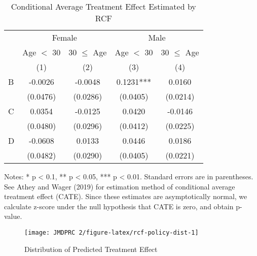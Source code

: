 \documentclass[
  11pt,
  a4paper
]{article}
\begin{document}
\begin{table}[H]

\caption{\label{tab:rcf-int-cate}Conditional Average Treatment Effect Estimated by RCF}
\centering
\fontsize{9}{11}\selectfont
\begin{threeparttable}
\begin{tabular}[t]{lcccc}
\toprule
\multicolumn{1}{c}{ } & \multicolumn{2}{c}{Female} & \multicolumn{2}{c}{Male} \\
\cmidrule(l{3pt}r{3pt}){2-3} \cmidrule(l{3pt}r{3pt}){4-5}
\multicolumn{1}{c}{ } & \multicolumn{1}{c}{Age $<$ 30} & \multicolumn{1}{c}{30 $\le$ Age} & \multicolumn{1}{c}{Age $<$ 30} & \multicolumn{1}{c}{30 $\le$ Age} \\
\cmidrule(l{3pt}r{3pt}){2-2} \cmidrule(l{3pt}r{3pt}){3-3} \cmidrule(l{3pt}r{3pt}){4-4} \cmidrule(l{3pt}r{3pt}){5-5}
 & (1) & (2) & (3) & (4)\\
\midrule
B & -0.0026 & -0.0048 & 0.1231*** & 0.0160\\
 & (0.0476) & (0.0286) & (0.0405) & (0.0214)\\
C & 0.0354 & -0.0125 & 0.0420 & -0.0146\\
 & (0.0480) & (0.0296) & (0.0412) & (0.0225)\\
D & -0.0608 & 0.0133 & 0.0446 & 0.0186\\
 & (0.0482) & (0.0290) & (0.0405) & (0.0221)\\
\bottomrule
\end{tabular}
\begin{tablenotes}
\item Notes: * p < 0.1, ** p < 0.05, *** p < 0.01. Standard errors are in parentheses. See Athey and Wager (2019) for estimation method of conditional average treatment effect (CATE). Since these estimates are asymptotically normal, we calculate z-score under the null hypothesis that CATE is zero, and obtain p-value. 
\end{tablenotes}
\end{threeparttable}
\end{table}

\begin{figure}[t]
\texttt{[image: JMDPRC~2/figure-latex/rcf-policy-dist-1]} \caption{Distribution of Predicted Treatment Effect}\label{fig:rcf-policy-dist}
\end{figure}
\end{document}
